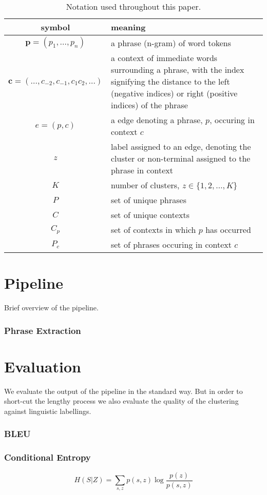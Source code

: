\begin{table}
\begin{tabular}{cp{}}
\toprule
  symbol & meaning \\
\midrule
  $\mathbf{p} = (p_1, \ldots, p_n)$ & a phrase (n-gram) of word tokens \\
  $\mathbf{c} = (\ldots, c_{-2}, c_{-1}, c_1 c_2, \ldots)$ & a context of immediate words surrounding a phrase, with the index signifying the distance to the left (negative indices) or right (positive indices) of the phrase \\
  $e = (p, c)$  & a edge denoting a phrase, $p$, occuring in context $c$ \\
  $z$ & label assigned to an edge, denoting the cluster or non-terminal assigned to the phrase in context \\
  $K$ & number of clusters, $z \in \{1,2, \ldots, K\}$ \\
  $P$ & set of unique phrases \\
  $C$ & set of unique contexts \\
  $C_p$ & set of contexts in which $p$ has occurred \\
  $P_c$ & set of phrases occuring in context $c$ \\
\bottomrule
\end{tabular}
\caption{Notation used throughout this paper.}
\end{table}

\section{Pipeline}

Brief overview of the pipeline. 

\subsubsection{Phrase Extraction}

\section{Evaluation}

We evaluate the output of the pipeline in the standard way. But in order to short-cut the lengthy process we also evaluate the quality of the clustering against linguistic labellings.

\subsubsection{BLEU}

\subsubsection{Conditional Entropy}

\[ H(S|Z) = \sum_{s,z} p(s,z) \log \frac{p(z)}{p(s,z)} \]

